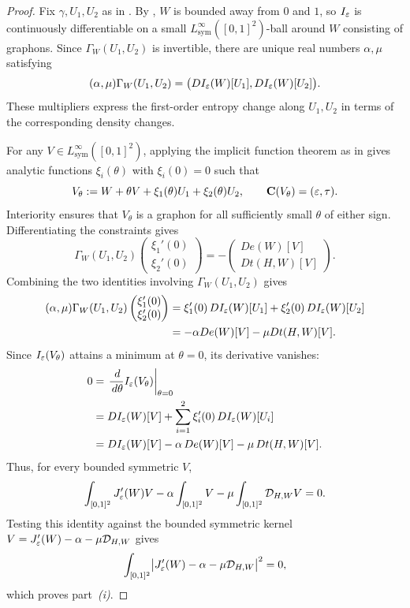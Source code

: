 \begin{proof}
Fix $\gamma,U_1,U_2$ as in .
By , $W$ is bounded away from $0$ and $1$, so
$I_\varepsilon$ is continuously differentiable on a small
$L^\infty_{\mathrm{sym}}([0,1]^2)$-ball around $W$ consisting of graphons.
Since $\Gamma_W(U_1,U_2)$ is invertible, there are unique real numbers
$\alpha,\mu$ satisfying
\[
  (\alpha,\mu)\Gamma_W(U_1,U_2)
  =\bigl(DI_\varepsilon(W)[U_1],DI_\varepsilon(W)[U_2]\bigr).
\]
These multipliers express the first-order entropy change along
$U_1,U_2$ in terms of the corresponding density changes.

For any $V\in L^\infty_{\mathrm{sym}}([0,1]^2)$, applying the implicit function
theorem as in  gives
analytic functions $\xi_i(\theta)$ with $\xi_i(0)=0$ such that
\[
  V_\theta:=W+\theta V+\xi_1(\theta)U_1+\xi_2(\theta)U_2,
  \qquad \mathbf C(V_\theta)=(\varepsilon,\tau).
\]
Interiority ensures that $V_\theta$ is a graphon for all sufficiently
small $\theta$ of either sign. Differentiating the constraints gives
\[
  \Gamma_W(U_1,U_2)
  \begin{pmatrix}\xi_1'(0)\\\xi_2'(0)\end{pmatrix}
  =-\begin{pmatrix}De(W)[V]\\Dt(H,W)[V]\end{pmatrix}.
\]
Combining the two identities involving $\Gamma_W(U_1,U_2)$ gives
\begin{align*}
  (\alpha,\mu) \Gamma_W(U_1,U_2)
  \begin{pmatrix}\xi_1'(0)\\\xi_2'(0)\end{pmatrix}
  &=\xi_1'(0)\,DI_\varepsilon(W)[U_1]+\xi_2'(0)\,DI_\varepsilon(W)[U_2]\\
  &=-\alpha De(W)[V]-\mu Dt(H,W)[V].
\end{align*}
Since $I_\varepsilon(V_\theta)$ attains a minimum at $\theta=0$, its derivative
vanishes:
\begin{align}
  0&=\left.\frac{\,d}{\,d\theta}I_\varepsilon(V_\theta)\right|_{\theta=0}\notag\\
   &=DI_\varepsilon(W)[V]+\sum_{i=1}^2\xi_i'(0)\,DI_\varepsilon(W)[U_i]\notag\\
   &=DI_\varepsilon(W)[V]-\alpha\,De(W)[V]-\mu\,Dt(H,W)[V].
   \label{eq:fixed-stationarity}
\end{align}
Thus, for every bounded symmetric $V$,
\[
  \int_{[0,1]^2}J_\varepsilon'(W)V
  -\alpha\int_{[0,1]^2}V
  -\mu\int_{[0,1]^2}\mathcal D_{H,W}V
  =0.
\]
Testing this identity against the bounded symmetric kernel
$V=J_\varepsilon'(W)-\alpha-\mu\mathcal D_{H,W}$ gives
\[
  \int_{[0,1]^2}\bigl|J_\varepsilon'(W)-\alpha-\mu\mathcal D_{H,W}\bigr|^2=0,
\]
which proves part~\textit{(i)}.


\end{proof}
